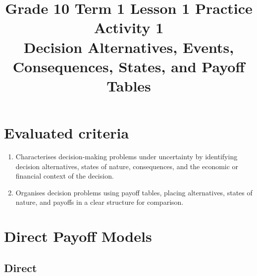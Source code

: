 \makeatletter
{}
\makeatother



\title{Grade 10 Term 1 Lesson 1 Practice Activity 1\\Decision Alternatives, Events, Consequences, States, and Payoff Tables}
\author{}
\date{}


	\maketitle

	\setcounter{tocdepth}{1}
	\setcounter{secnumdepth}{2}
	\label{toc}
	\tableofcontents

	\section*{Evaluated criteria}
	\begin{enumerate}[label=\textbf{C\arabic*.}]
		\item Characterises decision-making problems under uncertainty by identifying decision alternatives, states of nature, consequences, and the economic or financial context of the decision.
		\item Organises decision problems using payoff tables, placing alternatives, states of nature, and payoffs in a clear structure for comparison.
	\end{enumerate}

	\section{Direct Payoff Models}
	\label{sec:direct-payoff-models}


\subsection{Direct}
	\label{sec:direct-alternative-state-payoffs}

